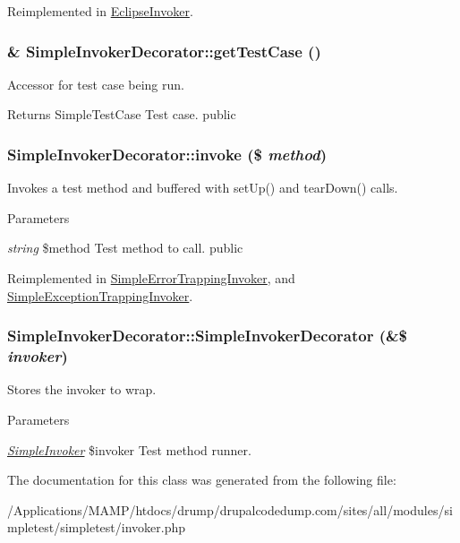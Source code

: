 Reimplemented in \hyperlink{class_eclipse_invoker_a0f16409fb93e1e0e1d6ff703a0f9f1cf}{EclipseInvoker}.\hypertarget{class_simple_invoker_decorator_a621cdedf65d9a2fc0a4ce35e475a720b}{
\subsubsection[{getTestCase}]{\setlength{\rightskip}{0pt plus 5cm}\& SimpleInvokerDecorator::getTestCase ()}}
\label{class_simple_invoker_decorator_a621cdedf65d9a2fc0a4ce35e475a720b}
Accessor for test case being run. \begin{DoxyReturn}{Returns}
SimpleTestCase Test case.  public 
\end{DoxyReturn}
\hypertarget{class_simple_invoker_decorator_a95431eef2d336fc92dbbc719a66cda32}{
\subsubsection[{invoke}]{\setlength{\rightskip}{0pt plus 5cm}SimpleInvokerDecorator::invoke (\$ {\em method})}}
\label{class_simple_invoker_decorator_a95431eef2d336fc92dbbc719a66cda32}
Invokes a test method and buffered with setUp() and tearDown() calls. 
\begin{DoxyParams}{Parameters}
\item[{\em string}]\$method Test method to call.  public \end{DoxyParams}


Reimplemented in \hyperlink{class_simple_error_trapping_invoker_ad9122507df8d27c3b7ab8fd1ecb53e45}{SimpleErrorTrappingInvoker}, and \hyperlink{class_simple_exception_trapping_invoker_a618f01b7137d3096e523f1f57eec861f}{SimpleExceptionTrappingInvoker}.\hypertarget{class_simple_invoker_decorator_a29f5d5512d26f640e9587503269b639b}{
\subsubsection[{SimpleInvokerDecorator}]{\setlength{\rightskip}{0pt plus 5cm}SimpleInvokerDecorator::SimpleInvokerDecorator (\&\$ {\em invoker})}}
\label{class_simple_invoker_decorator_a29f5d5512d26f640e9587503269b639b}
Stores the invoker to wrap. 
\begin{DoxyParams}{Parameters}
\item[{\em \hyperlink{class_simple_invoker}{SimpleInvoker}}]\$invoker Test method runner. \end{DoxyParams}


The documentation for this class was generated from the following file:\begin{DoxyCompactItemize}
\item 
/Applications/MAMP/htdocs/drump/drupalcodedump.com/sites/all/modules/simpletest/simpletest/invoker.php\end{DoxyCompactItemize}
